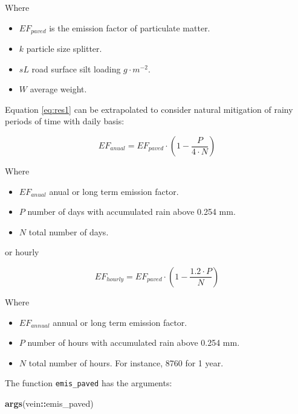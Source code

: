 \documentclass[12pt,graybox,envcountchap,sectrefs]{krantz}
\makeatletter
\newenvironment{Shaded}{\begin{snugshade}}{\end{snugshade}}
\newcommand{\KeywordTok}[1]{\textcolor[rgb]{0.13,0.29,0.53}{\textbf{#1}}}
\newcommand{\OperatorTok}[1]{\textcolor[rgb]{0.81,0.36,0.00}{\textbf{#1}}}
\newcommand{\NormalTok}[1]{#1}
\providecommand{\tightlist}{%
  \setlength{\itemsep}{0pt}\setlength{\parskip}{0pt}}
\newenvironment{kframe}{%
\medskip{}
\setlength{\fboxsep}{.8em}
 \def\at@end@of@kframe{}%
 \ifinner\ifhmode%
  \def\at@end@of@kframe{\end{minipage}}%
  \begin{minipage}{\columnwidth}%
 \fi\fi%
 \def\FrameCommand##1{\hskip\@totalleftmargin \hskip-\fboxsep
 \colorbox{shadecolor}{##1}\hskip-\fboxsep
     \hskip-\linewidth \hskip-\@totalleftmargin \hskip\columnwidth}%
 \MakeFramed {\advance\hsize-\width
   \@totalleftmargin\z@ \linewidth\hsize
   \@setminipage}}%
 {\par\unskip\endMakeFramed%
 \at@end@of@kframe}
\renewenvironment{Shaded}{\begin{kframe}}{\end{kframe}}
\theoremstyle{definition}
\theoremstyle{definition}
\theoremstyle{definition}
\theoremstyle{remark}
\makeatother
\begin{document}
Where

\begin{itemize}
\tightlist
\item
  \(EF_{paved}\) is the emission factor of particulate matter.
\item
  \(k\) particle size splitter.
\item
  \(sL\) road surface silt loading \(g \cdot m^{-2}\).
\item
  \(W\) average weight.
\end{itemize}

Equation \eqref{eq:res1} can be extrapolated to consider natural
mitigation of rainy periods of time with daily basis:

\begin{equation}
EF_{anual} = EF_{paved} \cdot (1 - \frac{P}{4 \cdot N})
\label{eq:res2}
\end{equation}

Where

\begin{itemize}
\tightlist
\item
  \(EF_{anual}\) anual or long term emission factor.
\item
  \(P\) number of days with accumulated rain above 0.254 mm.
\item
  \(N\) total number of days.
\end{itemize}

or hourly

\begin{equation}
EF_{hourly} = EF_{paved} \cdot (1 - \frac{1.2 \cdot P}{N})
\label{eq:res2}
\end{equation}

Where

\begin{itemize}
\tightlist
\item
  \(EF_{annual}\) annual or long term emission factor.
\item
  \(P\) number of hours with accumulated rain above 0.254 mm.
\item
  \(N\) total number of hours. For instance, 8760 for 1 year.
\end{itemize}

The function \texttt{emis\_paved} has the arguments:

\begin{Shaded}
\begin{Highlighting}[]
\KeywordTok{args}\NormalTok{(vein}\OperatorTok{::}\NormalTok{emis_paved)}
\end{Highlighting}
\end{Shaded}
\end{document}
